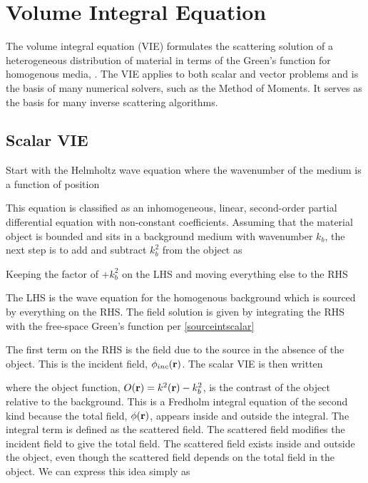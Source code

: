 {\footnotesize
{}
}

{\footnotesize
{}
}

\clearpage
\newpage
\section{Volume Integral Equation}

The volume integral equation (VIE) formulates the scattering solution of a heterogeneous distribution of material in terms of the Green's function for homogenous media, \cite{chew1995waves}. The VIE applies to both scalar and vector problems and is the basis of many numerical solvers, such as the Method of Moments. It serves as the basis for many inverse scattering algorithms. 

\subsection{Scalar VIE}
Start with the Helmholtz wave equation where the wavenumber of the medium is a function of position

This equation is classified as an inhomogeneous, linear, second-order partial differential equation with non-constant coefficients. Assuming that the material object is bounded and sits in a background medium with wavenumber $k_b$, the next step is to add and subtract $k_b^2$ from the object as

Keeping the factor of $+k_b^2$ on the LHS and moving everything else to the RHS 

The LHS is the wave equation for the homogenous background which is sourced by everything on the RHS. The field solution is given by integrating the RHS with the free-space Green's function per \eqref{sourceintscalar} 

The first term on the RHS is the field due to the source in the absence of the object. This is the incident field, $\phi_{inc}(\mathbf{r})$. The scalar VIE is then written

\noindent where the object function, $O(\mathbf{r}) = k^2(\mathbf{r}) - k_b^2 $, is the contrast of the object relative to the background.  This is a Fredholm integral equation of the second kind because the total field, $\phi(\mathbf{r})$, appears inside and outside the integral. The integral term is defined as the scattered field. The scattered field modifies the incident field to give the total field. The scattered field exists inside and outside the object, even though the scattered field depends on the total field in the object. We can express this idea simply as

